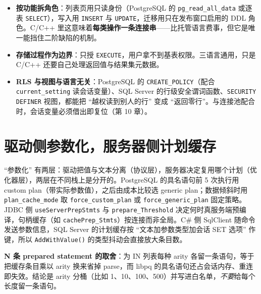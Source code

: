 \documentclass[12pt,a4paper,fontset=fandol]{ctexbook}
\newcommand{\Fn}[1]{\texttt{#1()}}
\newcommand{\Tp}[1]{\texttt{#1}}
\newcommand{\CSharp}{C\#}
\newcommand{\CppJava}{C/C++}
\begin{document}
\begin{itemize}
  \item \textbf{按功能拆角色}：列表页用只读身份（PostgreSQL 的 \Tp{pg\_read\_all\_data} 或逐表 \Tp{SELECT}），写入用 \Tp{INSERT} 与 \Tp{UPDATE}，迁移用只在发布窗口启用的 DDL 角色。\CppJava{} 里这意味着\textbf{每类操作一条连接串}——比托管语言费事，但它是唯一能挡住二阶缺陷的机制。
  \item \textbf{存储过程作为边界}：只授 \Tp{EXECUTE}，用户拿不到基表权限。三语言通用，只是 \CppJava{} 还要自己处理返回值与结果集元数据。
  \item \textbf{RLS 与视图与语言无关}：PostgreSQL 的 \texttt{CREATE\_\allowbreak POLICY}（配合 \texttt{current\_setting} 读会话变量）、SQL Server 的行级安全谓词函数、\texttt{SECURITY DEFINER} 视图，都能把 ``越权读到别人的行'' 变成 ``返回零行''。与连接池配合时，会话变量必须借出即复位（第 10 章）。
\end{itemize}

\section{驱动侧参数化，服务器侧计划缓存}

``参数化'' 有两层：驱动把值与文本分离（协议层），服务器决定复用哪个计划（优化器层），两层在不同栈上是分开的。PostgreSQL 的具名语句前 5 次执行用 custom plan（带实际参数值），之后由成本比较选 generic plan；数据倾斜时用 \Tp{plan\_cache\_mode} 取 \Tp{force\_\allowbreak custom\_\allowbreak plan} 或 \Tp{force\_\allowbreak generic\_\allowbreak plan} 固定策略。JDBC 侧 \Tp{useServer\allowbreak PrepStmts} 与 \Tp{prepare\_\allowbreak Threshold} 决定何时真服务端预编译，句柄缓存（如 \Tp{cachePrep\_\allowbreak Stmts}）按连接而非全局。\CSharp{} 侧 SqlClient 随命令发送参数信息，SQL Server 的计划缓存按 ``文本加参数类型加会话 SET 选项'' 作键，所以 \Fn{AddWithValue} 的类型抖动会直接放大条目数。

\textbf{N 条 prepared statement 的取舍}：为 IN 列表每种 arity 各留一条语句，等于把缓存条目乘以 arity 换来省掉 parse，而 libpq 的具名语句还占会话内存、重连即失效。结论是 arity 分桶（比如 1、10、100、500）并写进白名单，\emph{不要}给每个长度留一条语句。
\end{document}

